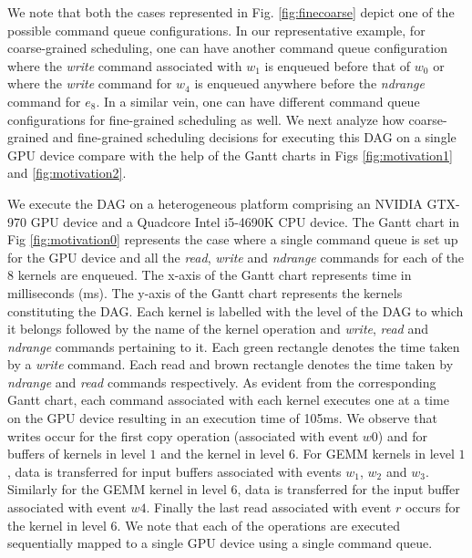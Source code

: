 	\par We note that both the cases represented in Fig. \ref{fig:finecoarse} depict one of the possible command queue configurations. In our representative example, for coarse-grained scheduling, one can have another command queue configuration where the \textit{write} command associated with $w_1$ is enqueued before that of $w_0$ or where the \textit{write} command for $w_4$ is enqueued anywhere before the \textit{ndrange} command for $e_8$. In a similar vein, one can have different command queue configurations for fine-grained scheduling as well. We next analyze how coarse-grained and fine-grained scheduling decisions for executing this DAG on a single GPU device compare with the help of the Gantt charts in Figs \ref{fig:motivation1} and \ref{fig:motivation2}. 
	\par We execute the DAG on a heterogeneous platform comprising an NVIDIA GTX-970 GPU device and a Quadcore Intel i5-4690K CPU device. The Gantt chart in Fig \ref{fig:motivation0} represents the case where a single command queue is set up for the GPU device and all the \textit{read}, \textit{write} and \textit{ndrange} commands for each of the 8 kernels are enqueued. The x-axis of the Gantt chart represents time in milliseconds (ms). The y-axis of the Gantt chart represents the kernels constituting the DAG. Each kernel is labelled with the level of the DAG to which it belongs followed by the name of the kernel operation and \textit{write}, \textit{read} and \textit{ndrange} commands pertaining to it. Each green rectangle denotes the time taken by a \textit{write} command. Each read and brown rectangle denotes the time taken by \textit{ndrange} and \textit{read} commands respectively. As evident from the corresponding Gantt chart, each command associated with each kernel executes one at a time on the GPU device resulting in an execution time of 105ms. We observe that writes occur for the first copy operation (associated with event $w0$) and for buffers of kernels in level $1$ and the kernel in level $6$. For GEMM kernels in level $1$, data is transferred for input buffers associated with events $w_1$, $w_2$ and $w_3$. Similarly for the GEMM kernel in level 6, data is transferred for the input buffer associated with event $w4$. Finally the last read associated with event $r$ occurs for the kernel in level $6$. We note that each of the operations are executed sequentially mapped to a single GPU device using a single command queue. 
